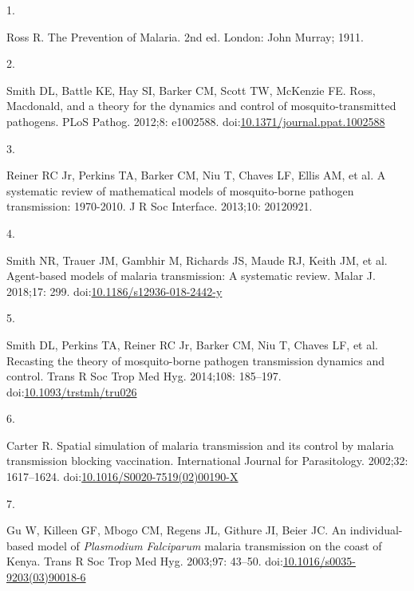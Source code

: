 \documentclass[
]{book}
\newlength{\cslhangindent}
\newlength{\csllabelwidth}
\newenvironment{CSLReferences}[2] %
 {\begin{list}{}{%
  \setlength{\itemindent}{0pt}
  \setlength{\leftmargin}{0pt}
  \setlength{\parsep}{0pt}
  \ifodd #1
   \setlength{\leftmargin}{\cslhangindent}
   \setlength{\itemindent}{-1\cslhangindent}
  \fi
  \setlength{\itemsep}{#2\baselineskip}}}
 {\end{list}}
\newcommand{\CSLLeftMargin}[1]{\parbox[t]{\csllabelwidth}{\strut#1\strut}}
\newcommand{\CSLRightInline}[1]{\parbox[t]{\linewidth - \csllabelwidth}{\strut#1\strut}}
\begin{document}
\label{refs}
\begin{CSLReferences}{0}{1}
\CSLLeftMargin{1. }%
\CSLRightInline{Ross R. The {Prevention} of {Malaria}. 2nd ed. {London}: {John Murray}; 1911. }

\CSLLeftMargin{2. }%
\CSLRightInline{Smith DL, Battle KE, Hay SI, Barker CM, Scott TW, McKenzie FE. Ross, {Macdonald}, and a theory for the dynamics and control of mosquito-transmitted pathogens. PLoS Pathog. 2012;8: e1002588. doi:\href{https://doi.org/10.1371/journal.ppat.1002588}{10.1371/journal.ppat.1002588}}

\CSLLeftMargin{3. }%
\CSLRightInline{Reiner RC Jr, Perkins TA, Barker CM, Niu T, Chaves LF, Ellis AM, et al. A systematic review of mathematical models of mosquito-borne pathogen transmission: 1970-2010. J R Soc Interface. 2013;10: 20120921. }

\CSLLeftMargin{4. }%
\CSLRightInline{Smith NR, Trauer JM, Gambhir M, Richards JS, Maude RJ, Keith JM, et al. Agent-based models of malaria transmission: {A} systematic review. Malar J. 2018;17: 299. doi:\href{https://doi.org/10.1186/s12936-018-2442-y}{10.1186/s12936-018-2442-y}}

\CSLLeftMargin{5. }%
\CSLRightInline{Smith DL, Perkins TA, Reiner RC Jr, Barker CM, Niu T, Chaves LF, et al. Recasting the theory of mosquito-borne pathogen transmission dynamics and control. Trans R Soc Trop Med Hyg. 2014;108: 185--197. doi:\href{https://doi.org/10.1093/trstmh/tru026}{10.1093/trstmh/tru026}}

\CSLLeftMargin{6. }%
\CSLRightInline{Carter R. Spatial simulation of malaria transmission and its control by malaria transmission blocking vaccination. International Journal for Parasitology. 2002;32: 1617--1624. doi:\href{https://doi.org/10.1016/S0020-7519(02)00190-X}{10.1016/S0020-7519(02)00190-X}}

\CSLLeftMargin{7. }%
\CSLRightInline{Gu W, Killeen GF, Mbogo CM, Regens JL, Githure JI, Beier JC. An individual-based model of {\emph{Plasmodium}}{ \emph{Falciparum} } malaria transmission on the coast of {Kenya}. Trans R Soc Trop Med Hyg. 2003;97: 43--50. doi:\href{https://doi.org/10.1016/s0035-9203(03)90018-6}{10.1016/s0035-9203(03)90018-6}}


\end{CSLReferences}
\end{document}

